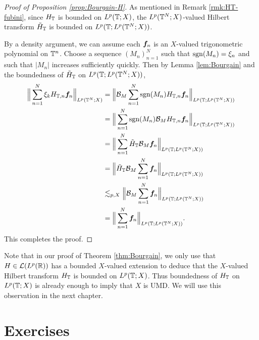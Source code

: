 \begin{proof}[Proof of Proposition \ref{prop:Bourgain-H}]
  As mentioned in Remark \ref{rmk:HT-fubini}, since $H_{\mathbb{T}}$ is bounded on $L^p(\mathbb{T};X)$,  the $L^p(\mathbb{T}^{N};X)$-valued Hilbert transform $\tilde{H}_{\mathbb{T}}$ is bounded on $L^p(\mathbb{T};L^p(\mathbb{T}^{N};X))$. 
  
  By a density argument, we can assume each $\bm{f}_{n}$ is an $X$-valued trigonometric polynomial on $\mathbb{T}^{n}$.
  Choose a sequence $(M_{n})_{n=1}^{N}$ such that $\operatorname{sgn}(M_n) = \xi_{n}$ and such that $|M_n|$ increases sufficiently quickly.
  Then by Lemma \ref{lem:Bourgain} and the boundedness of $\tilde{H}_{\mathbb{T}}$ on $L^p(\mathbb{T};L^p(\mathbb{T}^{N};X))$,
  \begin{equation*}
    \begin{aligned}
      \Big\| \sum_{n=1}^{N} \xi_{k} H_{\mathbb{T},n} \bm{f}_{n} \Big\|_{L^p(\mathbb{T}^{N};X)}
      &= \Big\| \mathcal{B}_{M} \sum_{n=1}^{N} \operatorname{sgn}(M_n) H_{\mathbb{T},n} \bm{f}_{n} \Big\|_{L^p(\mathbb{T};L^p(\mathbb{T}^{N};X))} \\
      &= \Big\| \sum_{n=1}^{N} \operatorname{sgn}(M_n) \mathcal{B}_{M} H_{\mathbb{T},n} \bm{f}_{n} \Big\|_{L^p(\mathbb{T};L^p(\mathbb{T}^{N};X))} \\
      &= \Big\| \sum_{n=1}^{N} \tilde{H}_{\mathbb{T}} \mathcal{B}_{M} \bm{f}_{n} \Big\|_{L^p(\mathbb{T};L^p(\mathbb{T}^{N};X))} \\
      &=  \Big\| \tilde{H}_{\mathbb{T}} \mathcal{B}_{M}\sum_{n=1}^{N} \bm{f}_{n} \Big\|_{L^p(\mathbb{T};L^p(\mathbb{T}^{N};X))} \\
      &\lesssim_{p,X} \Big\| \mathcal{B}_{M} \sum_{n=1}^{N} \bm{f}_{n} \Big\|_{L^p(\mathbb{T};L^p(\mathbb{T}^{N};X))} \\
      &= \Big\| \sum_{n=1}^{N} \bm{f}_{n} \Big\|_{L^p(\mathbb{T};L^p(\mathbb{T}^{N};X))}.
    \end{aligned}
  \end{equation*}
  This completes the proof.
\end{proof}

\begin{rmk}\label{rmk:HT-UMD-T}
  Note that in our proof of Theorem \ref{thm:Bourgain}, we only use that $H \in \mathcal{L}(L^p(\mathbb{R}))$ has a bounded $X$-valued extension to deduce that the $X$-valued Hilbert transform $H_{\mathbb{T}}$ is bounded on $L^p(\mathbb{T};X)$.
  Thus boundedness of $H_{\mathbb{T}}$ on $L^p(\mathbb{T};X)$ is already enough to imply that $X$ is UMD.
  We will use this observation in the next chapter.
\end{rmk}




\section*{Exercises}

